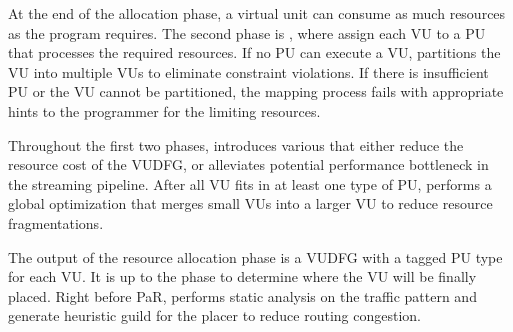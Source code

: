 At the end of the allocation phase, a virtual unit can consume as much resources as the program
requires. The second phase is , where \name assign each VU to a
PU that processes the required resources. If no PU can execute a VU, \name partitions the
VU into multiple VUs to eliminate constraint violations. If there is insufficient PU or the VU cannot be partitioned, the mapping process fails with appropriate hints to the programmer for the
limiting resources.

Throughout the first two phases, \name introduces various  that either reduce the
resource cost of the VUDFG, or alleviates potential performance bottleneck in the streaming
pipeline.
After all VU fits in at least one type of PU, \name performs a global optimization that merges small VUs into a larger VU to reduce resource fragmentations.

The output of the resource allocation phase is a VUDFG with a tagged PU type for each VU.
It is up to the
 phase to determine where the VU will be finally placed.
Right before PaR, \name performs static analysis on the traffic pattern and generate heuristic guild
for the placer to reduce routing congestion.


